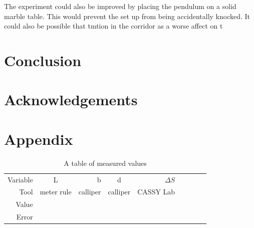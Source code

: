 \documentclass[12pt]{article}
\begin{document}
The experiment could also be improved by placing the pendulum on a solid marble table. This would prevent the set up from being accidentally knocked. It could also be possible that tmtion in the corridor as a worse affect on t

%
%

\section{Conclusion}

%
%





\section{Acknowledgements}

\section{Appendix}

\begin{table}[htdp]
\vline
\begin{tabular}{| r | c | r  | c | r  | c | r |  c | r }
\hline 
Variable & L & b & d  & $\Delta S$  \\
Tool & meter rule  & calliper  & calliper & CASSY Lab   \\
Value  &  &  &  &  &   \\
Error &  &  &  &  &   \\

\end{tabular}
\vline
\caption{A table of measured values }
\end{table}%
\end{document}
